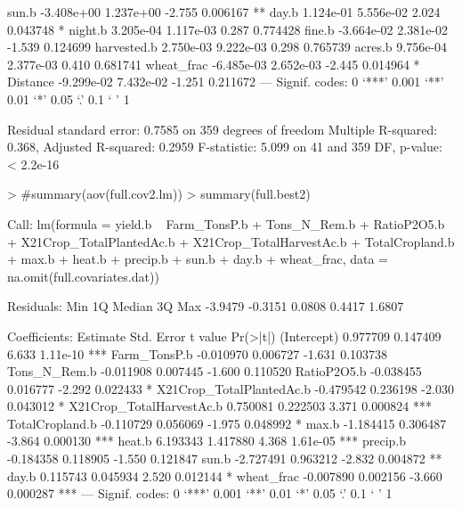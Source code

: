 \documentclass{report}
\begin{document}
\begin{Schunk}
\begin{Soutput}
sun.b                            -3.408e+00  1.237e+00  -2.755 0.006167 ** 
day.b                             1.124e-01  5.556e-02   2.024 0.043748 *  
night.b                           3.205e-04  1.117e-03   0.287 0.774428    
fine.b                           -3.664e-02  2.381e-02  -1.539 0.124699    
harvested.b                       2.750e-03  9.222e-03   0.298 0.765739    
acres.b                           9.756e-04  2.377e-03   0.410 0.681741    
wheat_frac                       -6.485e-03  2.652e-03  -2.445 0.014964 *  
Distance                         -9.299e-02  7.432e-02  -1.251 0.211672    
---
Signif. codes:  0 ‘***’ 0.001 ‘**’ 0.01 ‘*’ 0.05 ‘.’ 0.1 ‘ ’ 1

Residual standard error: 0.7585 on 359 degrees of freedom
Multiple R-squared:  0.368,	Adjusted R-squared:  0.2959 
F-statistic: 5.099 on 41 and 359 DF,  p-value: < 2.2e-16
\end{Soutput}
\begin{Sinput}
> #summary(aov(full.cov2.lm))
> summary(full.best2)
\end{Sinput}
\begin{Soutput}
Call:
lm(formula = yield.b ~ Farm_TonsP.b + Tons_N_Rem.b + RatioP2O5.b + 
    X21Crop_TotalPlantedAc.b + X21Crop_TotalHarvestAc.b + TotalCropland.b + 
    max.b + heat.b + precip.b + sun.b + day.b + wheat_frac, data = na.omit(full.covariates.dat))

Residuals:
    Min      1Q  Median      3Q     Max 
-3.9479 -0.3151  0.0808  0.4417  1.6807 

Coefficients:
                          Estimate Std. Error t value Pr(>|t|)    
(Intercept)               0.977709   0.147409   6.633 1.11e-10 ***
Farm_TonsP.b             -0.010970   0.006727  -1.631 0.103738    
Tons_N_Rem.b             -0.011908   0.007445  -1.600 0.110520    
RatioP2O5.b              -0.038455   0.016777  -2.292 0.022433 *  
X21Crop_TotalPlantedAc.b -0.479542   0.236198  -2.030 0.043012 *  
X21Crop_TotalHarvestAc.b  0.750081   0.222503   3.371 0.000824 ***
TotalCropland.b          -0.110729   0.056069  -1.975 0.048992 *  
max.b                    -1.184415   0.306487  -3.864 0.000130 ***
heat.b                    6.193343   1.417880   4.368 1.61e-05 ***
precip.b                 -0.184358   0.118905  -1.550 0.121847    
sun.b                    -2.727491   0.963212  -2.832 0.004872 ** 
day.b                     0.115743   0.045934   2.520 0.012144 *  
wheat_frac               -0.007890   0.002156  -3.660 0.000287 ***
---
Signif. codes:  0 ‘***’ 0.001 ‘**’ 0.01 ‘*’ 0.05 ‘.’ 0.1 ‘ ’ 1


\end{Soutput}
\end{Schunk}
\end{document}
